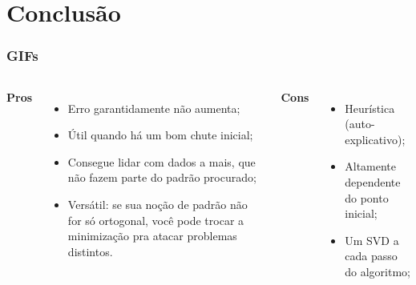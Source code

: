\section{Conclusão}
\begin{frame}[fragile]
  \frametitle{GIFs}
  \begin{center}
  \end{center}
\end{frame}

\begin{frame}
  \begin{columns}
    \textbf{Pros}
    \begin{itemize}
      \item Erro garantidamente não aumenta;
      \item Útil quando há um bom chute inicial;
      \item Consegue lidar com dados a mais, que não fazem parte do padrão procurado;
      \item Versátil: se sua noção de padrão não for só ortogonal, você pode trocar a minimização pra atacar problemas distintos.
    \end{itemize}
    \textbf{Cons}
    \begin{itemize}
      \item Heurística (auto-explicativo);
      \item Altamente dependente do ponto inicial;
      \item Um SVD a cada passo do algoritmo;
    \end{itemize}
  \end{columns}
\end{frame}

